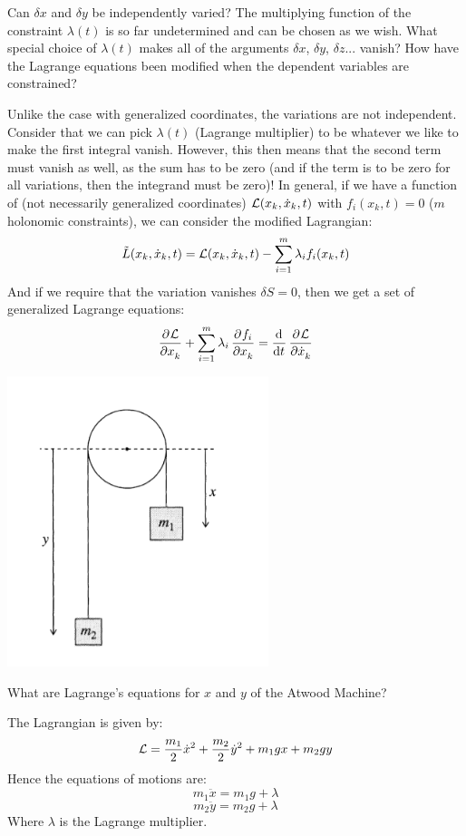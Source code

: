 \begin{p}
Can $\delta x$ and $\delta y$ be independently varied? The multiplying function of the constraint $\lambda(t)$ is so far undetermined and can be chosen as we wish. What special choice of $\lambda(t)$ makes all of the arguments $\delta x$, $\delta y$, $\delta z$... vanish? How have the Lagrange equations been modified when the dependent variables are constrained?
\end{p}
\begin{s}
Unlike the case with generalized coordinates, the variations are not independent. Consider that we can pick $\lambda (t)$ (Lagrange multiplier) to be whatever we like to make the first integral vanish. However, this then means that the second term must vanish as well, as the sum has to be zero (and if the term is to be zero for all variations, then the integrand must be zero)! In general, if we have a function of (not necessarily generalized coordinates) $\mathcal{L}(x_k, \dot{x}_k, t)$ with $f_{i}(x_k, t) = 0$ ($m$ holonomic constraints), we can consider the modified Lagrangian:
\[\tilde{L}(x_k, \dot{x}_k, t) = \mathcal{L}(x_k, \dot{x}_k, t) - \sum_{i=1}^m \lambda_i f_i(x_k, t)\]
And if we require that the variation vanishes $\delta S = 0$, then we get a set of generalized Lagrange equations:
\[\dpd{\LL}{x_k} + \sum_{i=1}^m \lambda_i \dpd{f_i}{x_k} = \dod{}{t}\dpd{\LL}{\dot{x}_k}\]

\end{s}

\begin{center}
    \includegraphics[scale=0.75]{Lecture-8/w8-img1.png}
\end{center}
\begin{p}
What are Lagrange's equations for $x$ and $y$ of the Atwood Machine?
\end{p}
\begin{s}
The Lagrangian is given by:
\[\mathcal{L} = \frac{m_1}{2}\dot{x}^2 + \frac{m_2}{2}\dot{y}^2 + m_1gx + m_2gy\]
Hence the equations of motions are:
\[m_1\ddot{x} = m_1g + \lambda\]
\[m_2\ddot{y} = m_2g + \lambda\]
Where $\lambda$ is the Lagrange multiplier.
\end{s}

